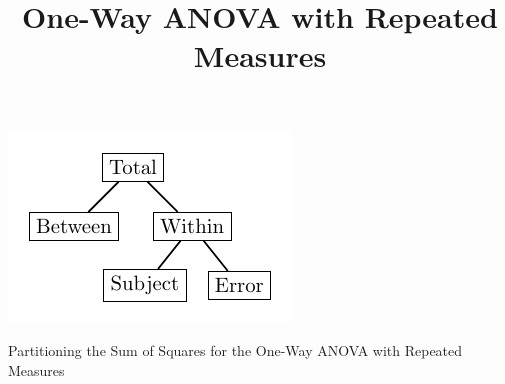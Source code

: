 \documentclass{tufte-handout}
\title{One-Way ANOVA with Repeated Measures}
\date{} %
\begin{document}
\maketitle%




\begin{marginfigure}[50pt]
  \includegraphics[width=\linewidth]{images/anova_partition_one_way_repeat}%
  \label{fig:fullfig}%
  \caption{Partitioning the Sum of Squares for the One-Way ANOVA with Repeated Measures}
\end{marginfigure}
\end{document}

